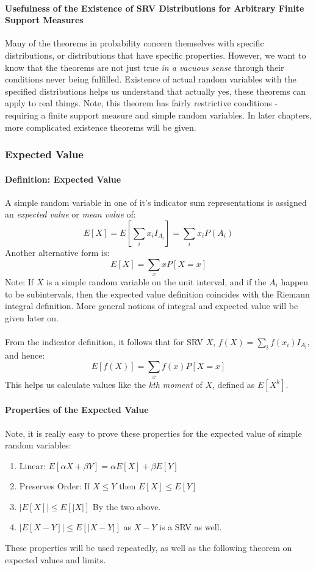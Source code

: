 \documentclass[12pt,a4paper]{article}
\newcommand{\1}[1]{\mathbbm{1}\left\{ #1 \right\}}
\begin{document}
\paragraph{Usefulness of the Existence of SRV Distributions for Arbitrary Finite Support Measures} Many of the theorems in probability concern themselves with specific distributions, or distributions that have specific properties. However, we want to know that the theorems are not just true \textit{in a vacuous sense} through their conditions never being fulfilled. Existence of actual random variables with the specified distributions helps us understand that actually yes, these theorems can apply to real things. Note, this theorem has fairly restrictive conditions - requiring a finite support measure and simple random variables. In later chapters, more complicated existence theorems will be given.

\subsubsection{Expected Value}
\paragraph{Definition: Expected Value} A simple random variable in one of it's indicator sum representations is assigned an \textit{expected value} or \textit{mean value} of:
$$
	E[X] = E\left[\sum_i x_i I_{A_i}\right] = \sum_i x_i P(A_i)
$$
Another alternative form is:
$$
	E[X] = \sum_x xP[X = x]
$$
Note: If $X$ is a simple random variable on the unit interval, and if the $A_i$ happen to be subintervals, then the expected value definition coincides with the Riemann integral definition. More general notions of integral and expected value will be given later on.
\\\\
From the indicator definition, it follows that for SRV $X$, $f(X) = \sum_i f(x_i) I_{A_i}$, and hence:
$$
	E[f(X)] = \sum_x f(x) P[X = x]
$$
This helps us calculate values like the \textit{kth moment} of $X$, defined as $E[X^k]$.

\paragraph{Properties of the Expected Value} Note, it is really easy to prove these properties for the expected value of simple random variables:
\begin{enumerate}
	\item Linear: $E[\alpha X + \beta Y] = \alpha E[X] + \beta E[Y]$
	\item Preserves Order: If $X \leq Y$ then $E[X] \leq E[Y]$
	\item $|E[X]| \leq E[|X|]$ By the two above. 
	\item $|E[X - Y]| \leq E[|X - Y|]$ as $X - Y$ is a SRV as well. 
\end{enumerate}
These properties will be used repeatedly, as well as the following theorem on expected values and limits.
\end{document}
